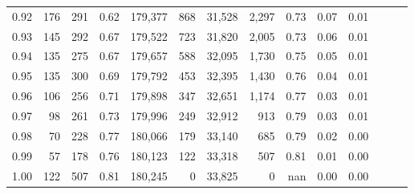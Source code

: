 \begin{tabular}{rrrrrrrrrrrrrr}
0.92 &    176 &  291 &  0.62 &  179,377 &      868 &  31,528 &   2,297 &  0.73 &  0.07 &      0.01 \\
0.93 &    145 &  292 &  0.67 &  179,522 &      723 &  31,820 &   2,005 &  0.73 &  0.06 &      0.01 \\
0.94 &    135 &  275 &  0.67 &  179,657 &      588 &  32,095 &   1,730 &  0.75 &  0.05 &      0.01 \\
0.95 &    135 &  300 &  0.69 &  179,792 &      453 &  32,395 &   1,430 &  0.76 &  0.04 &      0.01 \\
0.96 &    106 &  256 &  0.71 &  179,898 &      347 &  32,651 &   1,174 &  0.77 &  0.03 &      0.01 \\
0.97 &     98 &  261 &  0.73 &  179,996 &      249 &  32,912 &     913 &  0.79 &  0.03 &      0.01 \\
0.98 &     70 &  228 &  0.77 &  180,066 &      179 &  33,140 &     685 &  0.79 &  0.02 &      0.00 \\
0.99 &     57 &  178 &  0.76 &  180,123 &      122 &  33,318 &     507 &  0.81 &  0.01 &      0.00 \\
1.00 &    122 &  507 &  0.81 &  180,245 &        0 &  33,825 &       0 &   nan &  0.00 &      0.00 \\
\bottomrule
\end{tabular}
